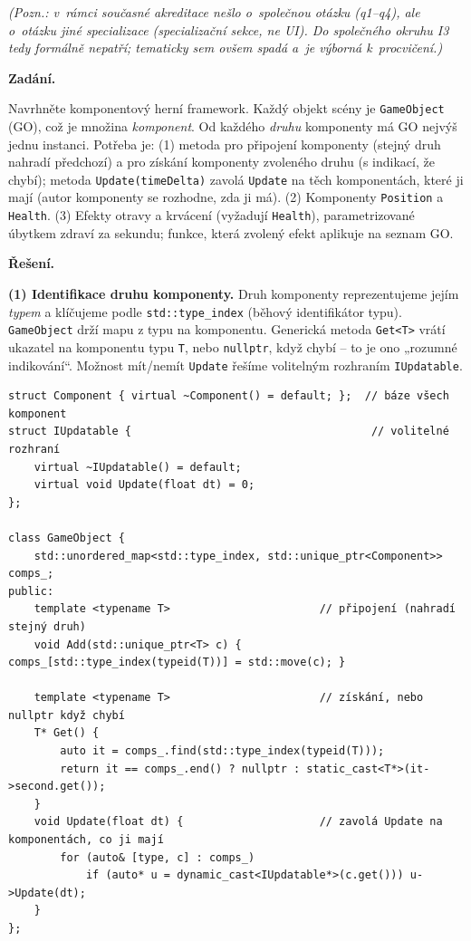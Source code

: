 \documentclass[11pt,a4paper]{article}
\newcommand{\cd}{\lstinline[style=cpp]}
\begin{document}
\begin{priklad}
\par

\noindent\textit{(Pozn.: v~rámci současné akreditace nešlo o~společnou otázku (q1--q4), ale o~otázku jiné specializace (specializační sekce, ne UI). Do společného okruhu I3 tedy formálně nepatří; tematicky sem ovšem spadá a~je výborná k~procvičení.)}\par

\textbf{Zadání.}\par
Navrhněte komponentový herní framework. Každý objekt scény je \texttt{GameObject} (GO), což je množina \emph{komponent}. Od každého \emph{druhu} komponenty má GO nejvýš jednu instanci. Potřeba je: (1) metoda pro připojení komponenty (stejný druh nahradí předchozí) a pro získání komponenty zvoleného druhu (s indikací, že chybí); metoda \texttt{Update(timeDelta)} zavolá \texttt{Update} na těch komponentách, které ji mají (autor komponenty se rozhodne, zda ji má). (2) Komponenty \texttt{Position} a \texttt{Health}. (3) Efekty otravy a krvácení (vyžadují \texttt{Health}), parametrizované úbytkem zdraví za sekundu; funkce, která zvolený efekt aplikuje na seznam GO.

\medskip
\textbf{Řešení.}\par
\textbf{(1) Identifikace druhu komponenty.} Druh komponenty reprezentujeme jejím \emph{typem} a klíčujeme podle \cd{std::type_index} (běhový identifikátor typu). \texttt{GameObject} drží mapu z typu na komponentu. Generická metoda \cd{Get<T>} vrátí ukazatel na komponentu typu \texttt{T}, nebo \cd{nullptr}, když chybí -- to je ono „rozumné indikování``. Možnost mít/nemít \texttt{Update} řešíme volitelným rozhraním \texttt{IUpdatable}.

\begin{lstlisting}[style=cpp]
struct Component { virtual ~Component() = default; };  // báze všech komponent
struct IUpdatable {                                     // volitelné rozhraní
    virtual ~IUpdatable() = default;
    virtual void Update(float dt) = 0;
};

class GameObject {
    std::unordered_map<std::type_index, std::unique_ptr<Component>> comps_;
public:
    template <typename T>                       // připojení (nahradí stejný druh)
    void Add(std::unique_ptr<T> c) { comps_[std::type_index(typeid(T))] = std::move(c); }

    template <typename T>                       // získání, nebo nullptr když chybí
    T* Get() {
        auto it = comps_.find(std::type_index(typeid(T)));
        return it == comps_.end() ? nullptr : static_cast<T*>(it->second.get());
    }
    void Update(float dt) {                     // zavolá Update na komponentách, co ji mají
        for (auto& [type, c] : comps_)
            if (auto* u = dynamic_cast<IUpdatable*>(c.get())) u->Update(dt);
    }
};
\end{lstlisting}


\end{priklad}
\end{document}
